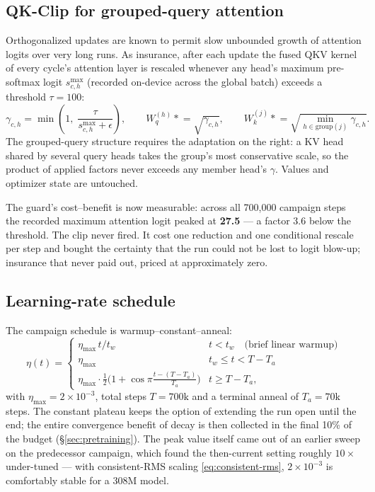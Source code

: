 \subsection{QK-Clip for grouped-query attention}

Orthogonalized updates are known to permit slow unbounded growth of
attention logits over very long runs. As insurance, after each update
the fused QKV kernel of every cycle's attention layer is rescaled
whenever any head's maximum pre-softmax logit $s^{\max}_{c,h}$ (recorded
on-device across the global batch) exceeds a threshold $\tau = 100$:
\begin{equation}
\gamma_{c,h} = \min\!\left(1,\; \frac{\tau}{s^{\max}_{c,h} + \epsilon}\right),
\qquad
W_q^{(h)} \mathrel{*}= \sqrt{\gamma_{c,h}},
\qquad
W_k^{(j)} \mathrel{*}= \sqrt{\min_{h \in \mathrm{group}(j)} \gamma_{c,h}} .
\label{eq:qkclip}
\end{equation}
The grouped-query structure requires the adaptation on the right: a KV
head shared by several query heads takes the group's most conservative
scale, so the product of applied factors never exceeds any member
head's $\gamma$. Values and optimizer state are untouched.

The guard's cost--benefit is now measurable: across all 700{,}000
campaign steps the recorded maximum attention logit peaked at
\textbf{27.5} --- a factor 3.6 below the threshold. The clip never
fired. It cost one reduction and one conditional rescale per step and
bought the certainty that the run could not be lost to logit blow-up;
insurance that never paid out, priced at approximately zero.

\subsection{Learning-rate schedule}

The campaign schedule is warmup--constant--anneal:
\begin{equation}
\eta(t) =
\begin{cases}
\eta_{\max}\, t / t_w & t < t_w \quad \text{(brief linear warmup)}\\[2pt]
\eta_{\max} & t_w \le t < T - T_a \\[2pt]
\eta_{\max} \cdot \tfrac{1}{2}\big(1 + \cos \pi \tfrac{t - (T - T_a)}{T_a}\big)
& t \ge T - T_a,
\end{cases}
\label{eq:schedule}
\end{equation}
with $\eta_{\max} = 2 \times 10^{-3}$, total steps $T = 700\mathrm{k}$
and a terminal anneal of $T_a = 70\mathrm{k}$ steps. The constant
plateau keeps the option of extending the run open until the end; the
entire convergence benefit of decay is then collected in the final 10\%
of the budget (\S\ref{sec:pretraining}). The peak value itself came out
of an earlier sweep on the predecessor campaign, which found the
then-current setting roughly $10\times$ under-tuned --- with
consistent-RMS scaling \eqref{eq:consistent-rms}, $2\times10^{-3}$ is
comfortably stable for a 308M model.
